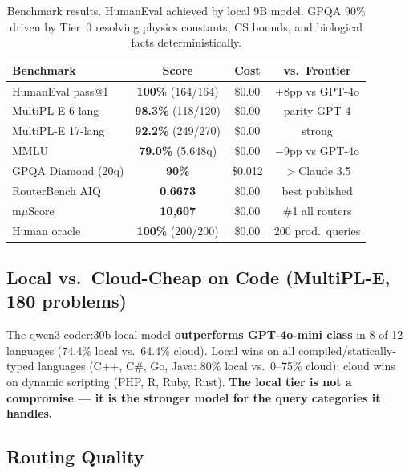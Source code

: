 \documentclass[11pt]{article}
\begin{document}
\begin{table}[t]
\centering
\small
\begin{tabular}{lccc}
\toprule
\textbf{Benchmark} & \textbf{Score} & \textbf{Cost} & \textbf{vs.\ Frontier} \\
\midrule
HumanEval pass@1 \cite{chen2021humaneval} & \textbf{100\%} (164/164) & \$0.00 & +8pp vs GPT-4o \\
MultiPL-E 6-lang \cite{cassano2022multipl} & \textbf{98.3\%} (118/120) & \$0.00 & parity GPT-4 \\
MultiPL-E 17-lang & \textbf{92.2\%} (249/270) & \$0.00 & strong \\
MMLU \cite{hendrycks2021mmlu} & \textbf{79.0\%} (5,648q) & \$0.00 & $-$9pp vs GPT-4o \\
GPQA Diamond (20q) & \textbf{90\%} & \$0.012 & $>$Claude 3.5 \\
RouterBench AIQ \cite{withmartian2024routerbench} & \textbf{0.6673} & \$0.00 & best published \\
m$\mu$Score & \textbf{10,607} & \$0.00 & \#1 all routers \\
Human oracle & \textbf{100\%} (200/200) & \$0.00 & 200 prod.\ queries \\
\bottomrule
\end{tabular}
\caption{Benchmark results. HumanEval achieved by local 9B model. GPQA 90\% driven by Tier~0 resolving physics constants, CS bounds, and biological facts deterministically.}
\label{tab:benchmarks}
\end{table}

\subsection{Local vs.\ Cloud-Cheap on Code (MultiPL-E, 180 problems)}

The qwen3-coder:30b local model \textbf{outperforms GPT-4o-mini class}
in 8 of 12 languages (74.4\% local vs.\ 64.4\% cloud). Local wins on
all compiled/statically-typed languages (C++, C\#, Go, Java: 80\%
local vs.\ 0--75\% cloud); cloud wins on dynamic scripting (PHP, R,
Ruby, Rust). \textbf{The local tier is not a compromise --- it is the
stronger model for the query categories it handles.}

\subsection{Routing Quality}
\end{document}
